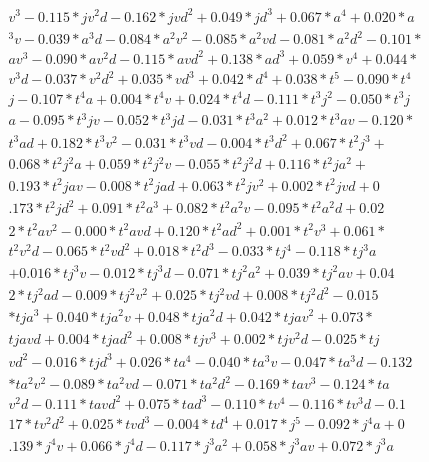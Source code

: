 \begin{align}
   v^3 -0.115 * j v^2 d -0.162 * j v d^2 + 0.049 * j d^3 + 0.067 * a^4 + 0.020 * a \\
  ^3 v -0.039 * a^3 d -0.084 * a^2 v^2 -0.085 * a^2 v d -0.081 * a^2 d^2 -0.101 *  \\
  a v^3 -0.090 * a v^2 d -0.115 * a v d^2 + 0.138 * a d^3 + 0.059 * v^4 + 0.044 *  \\
  v^3 d -0.037 * v^2 d^2 + 0.035 * v d^3 + 0.042 * d^4 + 0.038 * t^5 -0.090 * t^4  \\
  j -0.107 * t^4 a + 0.004 * t^4 v + 0.024 * t^4 d -0.111 * t^3 j^2 -0.050 * t^3 j \\
   a -0.095 * t^3 j v -0.052 * t^3 j d -0.031 * t^3 a^2 + 0.012 * t^3 a v -0.120 * \\
   t^3 a d + 0.182 * t^3 v^2 -0.031 * t^3 v d -0.004 * t^3 d^2 + 0.067 * t^2 j^3 + \\
   0.068 * t^2 j^2 a + 0.059 * t^2 j^2 v -0.055 * t^2 j^2 d + 0.116 * t^2 j a^2 +  \\
  0.193 * t^2 j a v -0.008 * t^2 j a d + 0.063 * t^2 j v^2 + 0.002 * t^2 j v d + 0 \\
  .173 * t^2 j d^2 + 0.091 * t^2 a^3 + 0.082 * t^2 a^2 v -0.095 * t^2 a^2 d + 0.02 \\
  2 * t^2 a v^2 -0.000 * t^2 a v d + 0.120 * t^2 a d^2 + 0.001 * t^2 v^3 + 0.061 * \\
   t^2 v^2 d -0.065 * t^2 v d^2 + 0.018 * t^2 d^3 -0.033 * t j^4 -0.118 * t j^3 a  \\
  + 0.016 * t j^3 v -0.012 * t j^3 d -0.071 * t j^2 a^2 + 0.039 * t j^2 a v + 0.04 \\
  2 * t j^2 a d -0.009 * t j^2 v^2 + 0.025 * t j^2 v d + 0.008 * t j^2 d^2 -0.015  \\
  * t j a^3 + 0.040 * t j a^2 v + 0.048 * t j a^2 d + 0.042 * t j a v^2 + 0.073 *  \\
  t j a v d + 0.004 * t j a d^2 + 0.008 * t j v^3 + 0.002 * t j v^2 d -0.025 * t j \\
   v d^2 -0.016 * t j d^3 + 0.026 * t a^4 -0.040 * t a^3 v -0.047 * t a^3 d -0.132 \\
   * t a^2 v^2 -0.089 * t a^2 v d -0.071 * t a^2 d^2 -0.169 * t a v^3 -0.124 * t a \\
   v^2 d -0.111 * t a v d^2 + 0.075 * t a d^3 -0.110 * t v^4 -0.116 * t v^3 d -0.1 \\
  17 * t v^2 d^2 + 0.025 * t v d^3 -0.004 * t d^4 + 0.017 * j^5 -0.092 * j^4 a + 0 \\
  .139 * j^4 v + 0.066 * j^4 d -0.117 * j^3 a^2 + 0.058 * j^3 a v + 0.072 * j^3 a  \\

\end{align}
